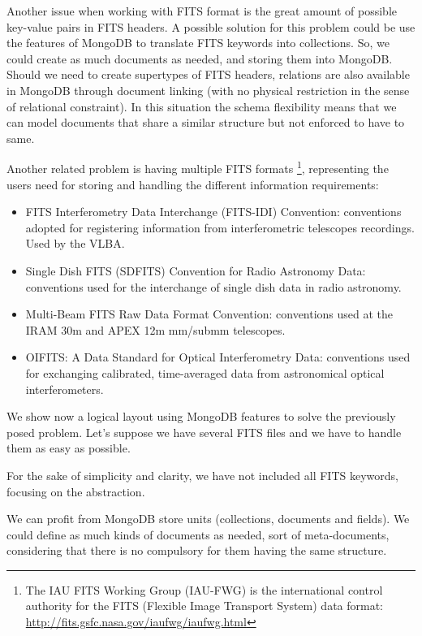 Another issue when working with FITS format is the great amount of possible key-value pairs in FITS headers. A possible solution for this problem could be use the features of MongoDB to translate FITS keywords into collections. So, we could create as much documents as needed, and storing them into MongoDB. Should we need to create supertypes of FITS headers, relations are also available in MongoDB through document linking (with no physical restriction in the sense of relational constraint). In this situation the schema flexibility means that we can model documents that share a similar structure but not enforced to have to same.

Another related problem is having multiple FITS formats \footnote{The IAU FITS Working Group (IAU-FWG) is the international control authority for the FITS (Flexible Image Transport System) data format: \url{http://fits.gsfc.nasa.gov/iaufwg/iaufwg.html}}, representing the users need for storing and handling the different information requirements:

\begin{itemize}
\item FITS Interferometry Data Interchange (FITS-IDI) Convention: conventions adopted for registering information from interferometric telescopes recordings. Used by the VLBA.
\item Single Dish FITS (SDFITS) Convention for Radio Astronomy Data: conventions used for the interchange of single dish data in radio astronomy. 
\item Multi-Beam FITS Raw Data Format Convention: conventions used at the IRAM 30m and APEX 12m mm/submm telescopes.
\item OIFITS: A Data Standard for Optical Interferometry Data: conventions used for exchanging calibrated, time-averaged data from astronomical optical interferometers.
\end{itemize}


We show now a logical layout using MongoDB features to solve the previously posed problem. Let's suppose we have several FITS files and we have to handle them as easy as possible.

For the sake of simplicity and clarity, we have not included all FITS keywords, focusing on the abstraction.

We can profit from MongoDB store units (collections, documents and fields). We could define as much kinds of documents as needed, sort of meta-documents, considering that there is no compulsory for them having the same structure. 

